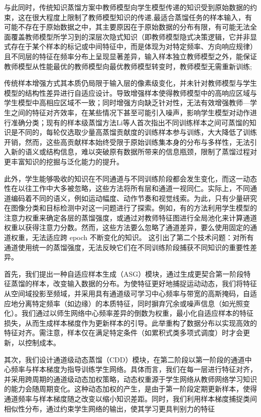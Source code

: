 \documentclass[10.5pt,letterpaper]{article}
\begin{document}
与此同时，传统知识蒸馏方案中教师模型向学生模型传递的知识受到原始数据的约束，这在很大程度上限制了教师模型知识的传递,最适合蒸馏任务的样本输入，有可能不存在于原始数据之中，其主要原因在于原始数据的分布有限，有可能无法全面覆盖教师模型所学习到的深层次隐式知识（即教师模型隐式决策逻辑，它并非显式存在于某个样本的标记或中间特征中，而是体现为对特定频率、方向响应规律）且不同层的特征在频率分布上呈现显著差异，输入样本独立教师模型之外，能保证教师模型从性能最优的教师模型向最优教师模型转变时，教师模型无需重新训练;

传统样本增强方式其本质仍局限于输入层的像素级变化，并未针对教师模型与学生模型的结构性差异进行自适应设计。导致增强样本使得教师模型中的高响应区域与学生模型中高相应区域不一致；同时增强方向缺乏针对性，无法有效增强教师—学生之间的特征对齐效率，在某些情况下甚至可能引入噪声，影响学生模型对动作进行准确分类；现有的样本级蒸馏方法Li等人\cite{li-acmmm2025-slakd}首次指出不同训练样本之间可蒸馏的知识是不同的，每轮仅选取少量高蒸馏贡献度的训练样本参与训练，大大降低了训练开销，然而，这些高贡献样本始终受限于原始训练集本身的分布与多样性，无法引入新的语义或结构信息，难以突破原有数据所带来的信息瓶颈，限制了蒸馏过程对更丰富知识的挖掘与泛化能力的提升。

此外，学生能够吸收的知识在不同通道与不同训练阶段都会发生变化，而这一动态性在以往工作中\cite{wang-aaai2024-gkd}\cite{wang-tip2024-dkd}\cite{liu-iclr2023-fkd}\cite{wang-cvpr2024-crosskd}大多被忽略，这些方法将所有层和通道一视同仁。实际上，不同通道编码着不同的语义，例如运动幅度、动作节奏和视觉线索。为此，只有少量研究在图像分类和目标检测中对这一问题进行了探索。例如，有的方法利用学生模型的注意力权重来确定各层的蒸馏强度\cite{passban-aaai2021-alpkd}，或通过对教师特征图进行全局池化来计算通道权重以获得注意力分数\cite{dai-aaai2025-channelkd}。然而，这些方法要么忽略了通道差异，要么使用固定的通道权重，无法适应跨 epoch 不断变化的知识。
这引出了第二个技术问题：对所有通道使用统一的蒸馏强度，无法反映它们在不同训练阶段捕获不同知识的重要性差异。

首先，我们提出一种自适应样本生成（ASG）模块，通过生成更契合第一阶段特征蒸馏的样本，改变输入数据的分布。为使特征更好地捕捉运动动态，我们将特征从空间域投影至频域，并采用具有通道级可学习中心频率与带宽的高斯掩码，自适应地分离特定频率（如边缘）的本质特征，同时摒弃冗余或噪声信息（如光照变化）。我们通过以师生网络中心频率差异的倒数为权重，最小化自适应样本的特征损失，从而生成样本梯度作为更新样本的引导。此举重构了数据分布以实现高效的特征对齐。需注意，样本仅在满足特定条件（如累积式类多项式调度）时才会更新，以控制成本。

其次，我们设计通道级动态蒸馏（CDD）模块，在第二阶段以第一阶段的通道中心频率与样本梯度为指导训练学生网络。具体而言，我们在每一层进行特征对齐，并采用跨周期的通道级动态加权策略，动态权重源于学生网络从教师网络学习知识的能力会随周期变化。这种动态加权的产生，是由于第一阶段定期更新样本，使得通道频率与样本梯度随之改变以缩小知识差距。同时，我们利用样本梯度捕捉类间相似性分布，通过约束学生网络的输出，使其学习更具判别力的特征
\end{document}
